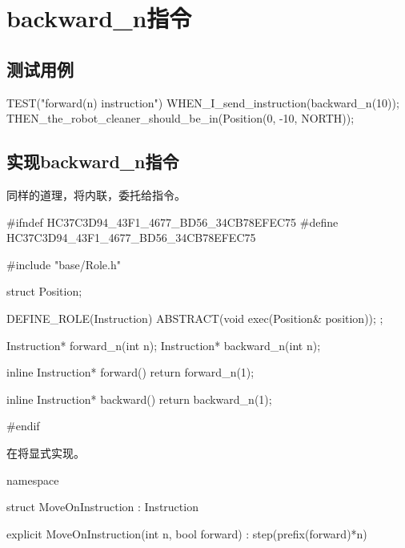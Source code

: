 \section{backward\_n指令}

\begin{content}
    
\subsection{测试用例}

\begin{leftbar}
\begin{c++}[caption={test/robot-cleaner/TestRobotCleaner.h}]
TEST("forward(n) instruction")
{
    WHEN_I_send_instruction(backward_n(10));
    THEN_the_robot_cleaner_should_be_in(Position(0, -10, NORTH));
}
\end{c++}
\end{leftbar}    

\subsection{实现backward\_n指令}

同样的道理，将内联，委托给指令。

\begin{leftbar}
\begin{c++}[caption={include/robot-cleaner/Instruction.h}]
#ifndef HC37C3D94_43F1_4677_BD56_34CB78EFEC75
#define HC37C3D94_43F1_4677_BD56_34CB78EFEC75

#include "base/Role.h"

struct Position;

DEFINE_ROLE(Instruction)
{
    ABSTRACT(void exec(Position& position));
};

Instruction* forward_n(int n);
Instruction* backward_n(int n);

inline Instruction* forward()
{ return forward_n(1); }

inline Instruction* backward()
{ return backward_n(1); }

#endif
\end{c++}
\end{leftbar}

在将显式实现。

\begin{leftbar}
\begin{c++}[caption={src/robot-cleaner/Instruction.cpp}]
namespace
{
    struct MoveOnInstruction : Instruction
    {
        explicit MoveOnInstruction(int n, bool forward)
          : step(prefix(forward)*n)
        {}

}}
\end{c++}
\end{leftbar}
\end{content}
